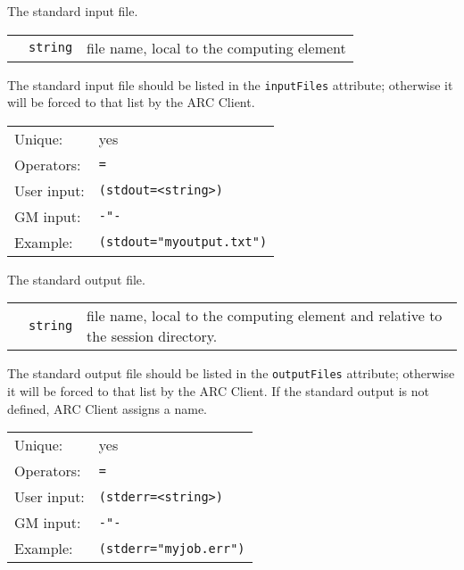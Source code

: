   The standard input file.

  \begin{tabular}{llp{10cm}}
    \hspace*{1cm}&\texttt{string} & file name, local to the computing element\\
  \end{tabular}

  The standard input file should be listed in the \texttt{inputFiles}
  attribute; otherwise it will be forced to that list by the ARC Client.

  \hspace*{0.5cm}
  \begin{shaded}
  \end{shaded}
  \begin{tabular}{lp{13cm}}
    Unique:&yes\\
    Operators:&\verb#=#\\
    User input:&\verb#(stdout=<string>)#\\
    GM input:&\verb#-"-#\\
    Example:&\verb#(stdout="myoutput.txt")#\\
  \end{tabular}

  The standard output file.

  \begin{tabular}{llp{10cm}}
    \hspace*{1cm}&\texttt{string} & file name, local to the computing element and
    relative to the session directory.\\
  \end{tabular}

  The standard output file should be listed in the
  \texttt{outputFiles} attribute; otherwise it will be forced to that
  list by the ARC Client. If the standard output is not defined, ARC Client assigns a
  name.

  \hspace*{0.5cm}
  \begin{shaded}
  \end{shaded}
  \begin{tabular}{lp{13cm}}
    Unique:&yes\\
    Operators:&\verb#=#\\
    User input:&\verb#(stderr=<string>)#\\
    GM input:&\verb#-"-#\\
    Example:&\verb#(stderr="myjob.err")#\\
  \end{tabular}

